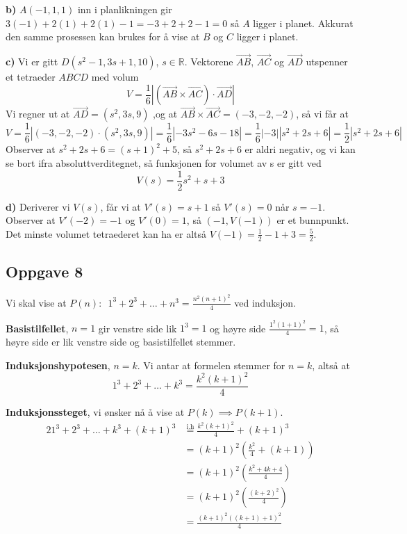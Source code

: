 \documentclass[12pt]{article}
\begin{document}
\begin{flushleft}
		\textbf{b)} $A(-1,1,1)$ inn i planlikningen gir $3(-1) + 2(1) + 2(1) - 1=-3+2+2-1=0$ så $A$ ligger i planet. Akkurat den samme prosessen kan brukes for å vise at $B$ og $C$ ligger i planet. \newline
		
		\textbf{c)} Vi er gitt $D(s^2-1,3s+1,10)$, $s \in \mathbb{R}$. Vektorene $\overrightarrow{AB}$, $\overrightarrow{AC}$ og $\overrightarrow{AD}$ utspenner et tetraeder $ABCD$ med volum $$V=\frac16 \left | (\overrightarrow{AB} \times \overrightarrow{AC}) \cdot \overrightarrow{AD}\right |$$ Vi regner ut at $\overrightarrow{AD}=(s^2,3s,9)$ ,og at $\overrightarrow{AB} \times \overrightarrow{AC} = (-3,-2,-2)$, så vi får at $$V=\frac16 \left| (-3,-2,-2) \cdot (s^2,3s,9) \right|=\frac{1}{6}\left|-3s^2-6s-18 \right|=\frac{1}{6}|-3||s^2+2s+6|=\frac12 |s^2+2s+6|$$ Observer at $s^2+2s+6=(s+1)^2+5$, så $s^2+2s+6$ er aldri negativ, og vi kan se bort ifra absoluttverditegnet, så funksjonen for volumet av s er gitt ved$$V(s)=\frac12s^2+s+3$$
		
		\textbf{d)} Deriverer vi $V(s)$, får vi at $V'(s)=s+1$ så $V'(s)=0$ når $s=-1$. Observer at $V'(-2)=-1$ og $V'(0)=1$, så $(-1,V(-1))$ er et bunnpunkt. Det minste volumet tetraederet kan ha er altså $V(-1)=\frac12 -1 + 3 = \frac52$.
		
		\subsection{Oppgave 8}
		Vi skal vise at $P(n): \enspace1^3+2^3+\dots+n^3=\frac{n^2(n+1)^2}{4}$ ved induksjon. \newline
		
		\textbf{Basistilfellet}, $n=1$ gir venstre side lik $1^3=1$ og høyre side $\frac{1^2(1+1)^2}{4}=1$, så høyre side er lik venstre side og basistilfellet stemmer. \newline
		
		\textbf{Induksjonshypotesen}, $n=k$. Vi antar at formelen stemmer for $n=k$, altså at $$1^3+2^3+\dots+k^3 = \frac{k^2(k+1)^2}{4}$$ 
		
		\textbf{Induksjonssteget}, vi ønsker nå å vise at $P(k)\implies P(k+1)$. 
		\begin{alignat*}{2}
			1^3+2^3+\dots+k^3+(k+1)^3 &\overset{\text{i.h}}{=} \frac{k^2(k+1)^2}{4} + (k+1)^3 \\
			&= (k+1)^2\left(\frac{k^2}{4} + (k+1)\right) \\
			&= (k+1)^2 \left(\frac{k^2+4k+4}{4}\right) \\
			&= (k+1)^2 \left(\frac{(k+2)^2}{4}\right) \\
			&= \frac{(k+1)^2((k+1)+1)^2}{4}
		\end{alignat*}
		\newpage

\end{flushleft}
\end{document}
